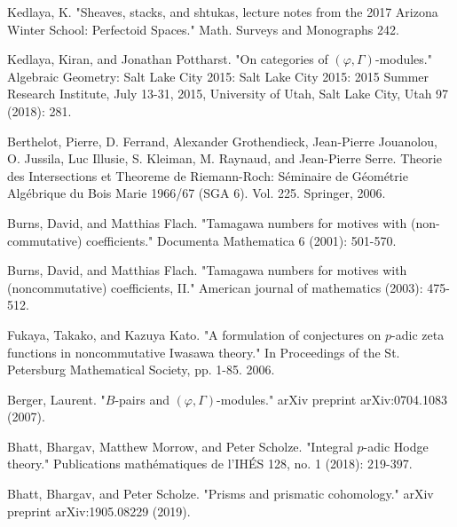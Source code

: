 \documentclass[12pt]{amsart}
\theoremstyle{definition}
\numberwithin{equation}{section}
\begin{document}
\begin{thebibliography}{10}
 Kedlaya, K. "Sheaves, stacks, and shtukas, lecture notes from the 2017 Arizona Winter School: Perfectoid Spaces." Math. Surveys and Monographs 242.


 Kedlaya, Kiran, and Jonathan Pottharst. "On categories of $(\varphi, \Gamma)$-modules." Algebraic Geometry: Salt Lake City 2015: Salt Lake City 2015: 2015 Summer Research Institute, July 13-31, 2015, University of Utah, Salt Lake City, Utah 97 (2018): 281.

 Berthelot, Pierre, D. Ferrand, Alexander Grothendieck, Jean-Pierre Jouanolou, O. Jussila, Luc Illusie, S. Kleiman, M. Raynaud, and Jean-Pierre Serre. Theorie des Intersections et Theoreme de Riemann-Roch: S\'eminaire de G\'eom\'etrie Alg\'ebrique du Bois Marie 1966/67 (SGA 6). Vol. 225. Springer, 2006.

 Burns, David, and Matthias Flach. "Tamagawa numbers for motives with (non-commutative) coefficients." Documenta Mathematica 6 (2001): 501-570.

 Burns, David, and Matthias Flach. "Tamagawa numbers for motives with (noncommutative) coefficients, II." American journal of mathematics (2003): 475-512.

 Fukaya, Takako, and Kazuya Kato. "A formulation of conjectures on $p$-adic zeta functions in noncommutative Iwasawa theory." In Proceedings of the St. Petersburg Mathematical Society, pp. 1-85. 2006.

 Berger, Laurent. "$B$-pairs and $(\varphi, \Gamma)$-modules." arXiv preprint arXiv:0704.1083 (2007).

 Bhatt, Bhargav, Matthew Morrow, and Peter Scholze. "Integral $ p $-adic Hodge theory." Publications math\'ematiques de l'IH\'ES 128, no. 1 (2018): 219-397.

 Bhatt, Bhargav, and Peter Scholze. "Prisms and prismatic cohomology." arXiv preprint arXiv:1905.08229 (2019).
  


\end{thebibliography}



%
\end{document}
